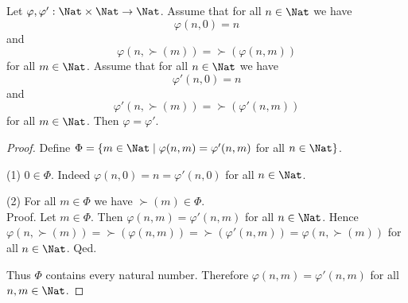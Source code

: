\documentclass{article}
\begin{document}
  \begin{forthel}
    \begin{lemma}\label{add_uniqueness}
      Let $\varphi, \varphi' : \Nat \times \Nat \to \Nat$.
      Assume that for all $n \in \Nat$ we have
      \[\varphi(n,0) = n\]
      and
      \[\varphi(n,\succ(m)) = \succ(\varphi(n,m))\]
      for all $m \in \Nat$.
      Assume that for all $n \in \Nat$ we have
      \[\varphi'(n,0) = n\]
      and
      \[\varphi'(n,\succ(m)) = \succ(\varphi'(n,m))\]
      for all $m \in \Nat$.
      Then $\varphi = \varphi'$.
    \end{lemma}
    \begin{proof}
      Define $\Phi = \{ m \in \Nat \mid \varphi(n,m) = \varphi'(n,m)$ for
      all $n \in \Nat \}$.

      (1) $0 \in \Phi$.
      Indeed $\varphi(n,0) = n = \varphi'(n,0)$ for all $n \in \Nat$.

      (2) For all $m \in \Phi$ we have $\succ(m) \in \Phi$. \\
      Proof.
        Let $m \in \Phi$.
        Then $\varphi(n,m) = \varphi'(n,m)$ for all $n \in \Nat$.
        Hence $\varphi(n, \succ(m))
          = \succ(\varphi(n,m))
          = \succ(\varphi'(n,m))
          = \varphi(n, \succ(m))$
        for all $n \in \Nat$.
      Qed.

      Thus $\Phi$ contains every natural number.
      Therefore $\varphi(n,m) = \varphi'(n,m)$ for all $n, m \in \Nat$.
    \end{proof}
  \end{forthel}
\end{document}
